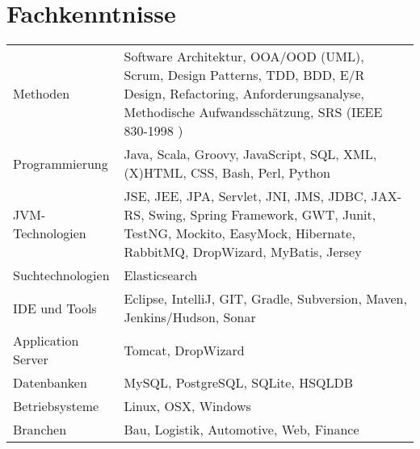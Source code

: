 \section*{Fachkenntnisse}
\begin{tabular}{@{}p{6cm}p{10cm}}
Methoden	& Software Architektur,  OOA/OOD (UML), Scrum, Design Patterns, TDD,  BDD,  E/R Design, Refactoring,  Anforderungsanalyse, Methodische Aufwandsschätzung, SRS (IEEE  830-1998 ) \\
Programmierung & Java, Scala, Groovy, JavaScript, SQL, XML, (X)HTML, CSS, Bash, Perl, Python \\
JVM-Technologien	& JSE, JEE, JPA, Servlet, JNI, JMS, JDBC, JAX-RS, Swing, Spring Framework, GWT, Junit, TestNG, Mockito, EasyMock, Hibernate, RabbitMQ, DropWizard, MyBatis, Jersey \\
Suchtechnologien	& Elasticsearch \\
IDE und Tools &	Eclipse, IntelliJ, GIT, Gradle, Subversion, Maven, Jenkins/Hudson, Sonar \\
Application Server & Tomcat, DropWizard \\
Datenbanken	& MySQL, PostgreSQL, SQLite, HSQLDB \\
Betriebsysteme &	Linux, OSX, Windows \\
Branchen & Bau, Logistik, Automotive, Web, Finance \\
\end{tabular}
